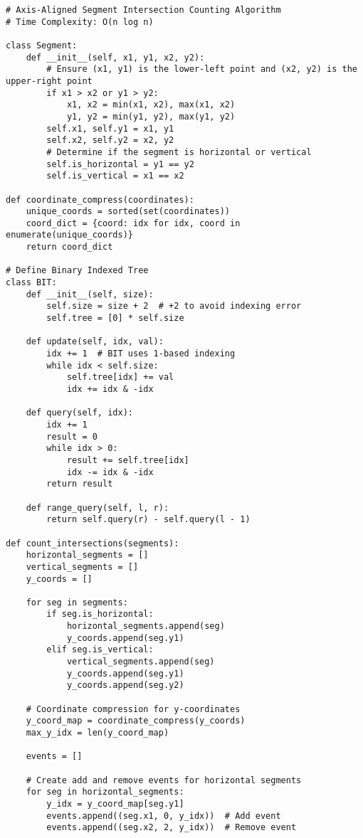 \documentclass{article}
\begin{document}
\begin{verbatim}
# Axis-Aligned Segment Intersection Counting Algorithm
# Time Complexity: O(n log n)

class Segment:
    def __init__(self, x1, y1, x2, y2):
        # Ensure (x1, y1) is the lower-left point and (x2, y2) is the upper-right point
        if x1 > x2 or y1 > y2:
            x1, x2 = min(x1, x2), max(x1, x2)
            y1, y2 = min(y1, y2), max(y1, y2)
        self.x1, self.y1 = x1, y1
        self.x2, self.y2 = x2, y2
        # Determine if the segment is horizontal or vertical
        self.is_horizontal = y1 == y2
        self.is_vertical = x1 == x2

def coordinate_compress(coordinates):
    unique_coords = sorted(set(coordinates))
    coord_dict = {coord: idx for idx, coord in enumerate(unique_coords)}
    return coord_dict

# Define Binary Indexed Tree
class BIT:
    def __init__(self, size):
        self.size = size + 2  # +2 to avoid indexing error
        self.tree = [0] * self.size

    def update(self, idx, val):
        idx += 1  # BIT uses 1-based indexing
        while idx < self.size:
            self.tree[idx] += val
            idx += idx & -idx

    def query(self, idx):
        idx += 1
        result = 0
        while idx > 0:
            result += self.tree[idx]
            idx -= idx & -idx
        return result

    def range_query(self, l, r):
        return self.query(r) - self.query(l - 1)

def count_intersections(segments):
    horizontal_segments = []
    vertical_segments = []
    y_coords = []

    for seg in segments:
        if seg.is_horizontal:
            horizontal_segments.append(seg)
            y_coords.append(seg.y1)
        elif seg.is_vertical:
            vertical_segments.append(seg)
            y_coords.append(seg.y1)
            y_coords.append(seg.y2)

    # Coordinate compression for y-coordinates
    y_coord_map = coordinate_compress(y_coords)
    max_y_idx = len(y_coord_map)

    events = []

    # Create add and remove events for horizontal segments
    for seg in horizontal_segments:
        y_idx = y_coord_map[seg.y1]
        events.append((seg.x1, 0, y_idx))  # Add event
        events.append((seg.x2, 2, y_idx))  # Remove event


\end{verbatim}
\end{document}
